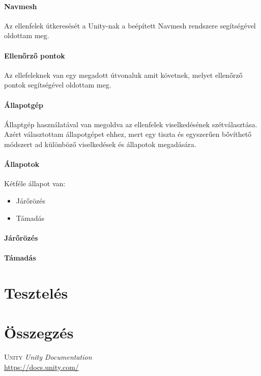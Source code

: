 \documentclass[
]{thesis-ekf}
\theoremstyle{definition}
\theoremstyle{remark}
\begin{document}
\subsubsection{Navmesh}

Az ellenfelek útkeresését a Unity-nak a beépített Navmesh rendszere segítségével oldottam meg.

\subsubsection{Ellenőrző pontok}

Az ellefeleknek van egy megadott útvonaluk amit követnek, melyet ellenőrző pontok segítségével oldottam meg.

%

\subsubsection{Állapotgép}

Állaptgép használatával van megoldva az ellenfelek viselkedésének szétválasztása. Azért választottam állapotgépet ehhez, mert egy tiszta és egyszerűen bővíthető módszert ad különböző viselkedések és állapotok megadására.



\subsubsection{Állapotok}

Kétféle állapot van:
\begin{itemize}
 \item Járőrözés
 \item Támadás
\end{itemize}

\subsubsection{Járőrözés}

\subsubsection{Támadás}



\chapter{Tesztelés}

\chapter*{Összegzés}


\begin{thebibliography}{55}
    \textsc{Unity} \emph{Unity Documentation}
    \\
    \url{https://docs.unity.com/}



\end{thebibliography}
\end{document}
